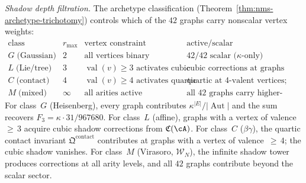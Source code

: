 \begin{computation}
\smallskip\noindent
\emph{Shadow depth filtration.}
The archetype classification
(Theorem~\ref{thm:nms-archetype-trichotomy})
controls which of the $42$ graphs carry nonscalar vertex weights:
\[
\renewcommand{\arraystretch}{1.2}
\begin{array}{c|c|c|l}
\text{class}
& r_{\max}
& \text{vertex constraint}
& \text{active/scalar} \\\hline
G\;\text{(Gaussian)}
  & 2 & \text{all vertices binary}
  & 42/42\text{ scalar (}\kappa\text{-only)} \\
L\;\text{(Lie/tree)}
  & 3 & \operatorname{val}(v) \geq 3\text{ activates cubic}
  & \text{cubic corrections at graphs with 3-valent vertices} \\
C\;\text{(contact)}
  & 4 & \operatorname{val}(v) \geq 4\text{ activates quartic}
  & \text{quartic at 4-valent vertices; cubic absent} \\
M\;\text{(mixed)}
  & \infty & \text{all arities active}
  & \text{all 42 graphs carry higher-arity corrections}
\end{array}
\]
For class~$G$ (Heisenberg), every graph contributes
$\kappa^{|E|}/|\operatorname{Aut}|$ and the sum recovers
$F_3 = \kappa\cdot 31/967680$.
For class~$L$ (affine), graphs with a vertex of valence~${\geq}\,3$
acquire cubic shadow corrections from $\mathfrak{C}(\cA)$.
For class~$C$ ($\beta\gamma$), the quartic contact invariant
$\mathfrak{Q}^{\mathrm{contact}}$ contributes at graphs with a
vertex of valence~${\geq}\,4$; the cubic shadow vanishes.
For class~$M$ (Virasoro, $\mathcal{W}_N$), the infinite shadow tower
produces corrections at all arity levels, and all $42$ graphs
contribute beyond the scalar sector.


\end{computation}
